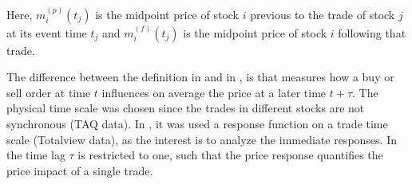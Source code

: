 Here, $m_{i}^{\left(p\right)}\left(t_{j}\right)$ is the midpoint price of stock
$i$ previous to the trade of stock $j$ at its event time $t_j$ and
$m_{i}^{\left(f\right)}\left(t_{j}\right)$ is the midpoint price of stock $i$
following that trade.

The difference between the definition in \cite{Wang_2016_cross} and in
\cite{Wang_2018_b}, is that \cite{Wang_2016_cross} measures how a buy or sell
order at time $t$ influences on average the price at a later time $t + \tau$.
The physical time scale was chosen since the trades in different stocks are not
synchronous (TAQ data). In \cite{Wang_2018_b}, it was used a response function
on a trade time scale (Totalview data), as the interest is to analyze the
immediate responses. In \cite{Wang_2018_b} the time lag $\tau$ is restricted to
one, such that the price response quantifies the price impact of a single
trade.
